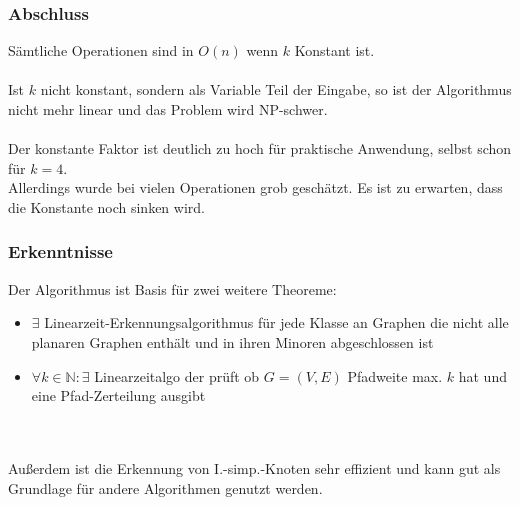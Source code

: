 \begin{frame}
\frametitle{Abschluss}
Sämtliche Operationen sind in $O(n)$ wenn $k$ Konstant ist. \\
\ \\
Ist $k$ nicht konstant, sondern als Variable Teil der Eingabe, so ist der Algorithmus nicht mehr linear und das Problem wird NP-schwer. \\
\ \\
Der konstante Faktor ist deutlich zu hoch für praktische Anwendung, selbst schon für $k=4$. \\
Allerdings wurde bei vielen Operationen grob geschätzt. Es ist zu erwarten, dass die Konstante noch sinken wird. \\
\end{frame}




\begin{frame}
\frametitle{Erkenntnisse}
Der Algorithmus ist Basis für zwei weitere Theoreme: \\
\begin{itemize}
	\item $\exists$ Linearzeit-Erkennungsalgorithmus für jede Klasse an Graphen die nicht alle planaren Graphen enthält und in ihren Minoren abgeschlossen ist
	\item $\forall k \in \mathbb{N}: \exists$ Linearzeitalgo der prüft ob $G=(V,E)$ Pfadweite max. $k$ hat und eine Pfad-Zerteilung ausgibt
\end{itemize}
\ \\
\ \\
Außerdem ist die Erkennung von I.-simp.-Knoten sehr effizient und kann gut als Grundlage für andere Algorithmen genutzt werden.
\end{frame}